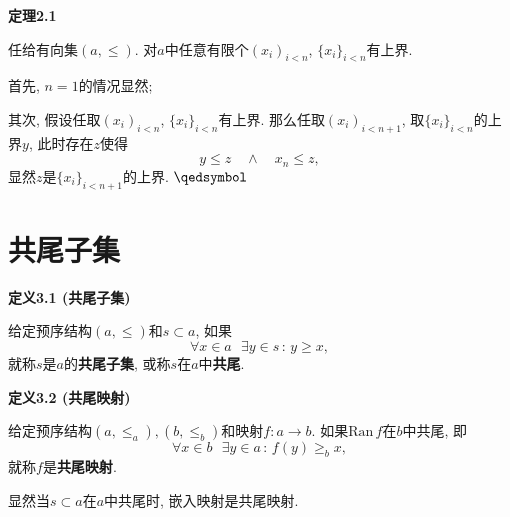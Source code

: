 \documentclass[UTF8]{ctexart}
\begin{document}
\vspace{10pt}

\hypertarget{sec:定理2.1}{}
\noindent\textbf{定理2.1}

任给有向集$(a,\leqslant)$. 对$a$中任意有限个$(x_i)_{i<n}$,
$\{x_i\}_{i<n}$有上界.


首先, $n=1$的情况显然;

其次, 假设任取$(x_i)_{i<n}$, $\{x_i\}_{i<n}$有上界. 那么任取$(x_i)_{i<n+1}$,
取$\{x_i\}_{i<n}$的上界$y$, 此时存在$z$使得
\[
    y\leqslant z\quad\land\quad x_n\leqslant z,
\]
显然$z$是$\{x_i\}_{i<n+1}$的上界. \hfill $\qedsymbol$





\vspace{20pt}

\section{共尾子集}

\hypertarget{sec:定义3.1}{}
\noindent\textbf{定义3.1 (共尾子集)}

给定预序结构$(a,\leqslant)$和$s\subset a$, 如果
\[
    \forall x\in a\,\,\,\,\exists y\in s\,:\,y\geqslant x,
\]
就称$s$是$a$的\textbf{共尾子集}, 或称$s$在$a$中\textbf{共尾}.

\vspace{10pt}

\hypertarget{sec:定义3.2}{}
\noindent\textbf{定义3.2 (共尾映射)}

给定预序结构$(a,\leqslant_a),(b,\leqslant_b)$和映射$f:a\to b$.
如果$\mathrm{Ran}\,f$在$b$中共尾, 即
\[
    \forall x\in b\,\,\,\,\exists y\in a\,:\,f(y)\geqslant_b x,
\]
就称$f$是\textbf{共尾映射}.

\vspace{10pt}

显然当$s\subset a$在$a$中共尾时, 嵌入映射是共尾映射.
\end{document}
